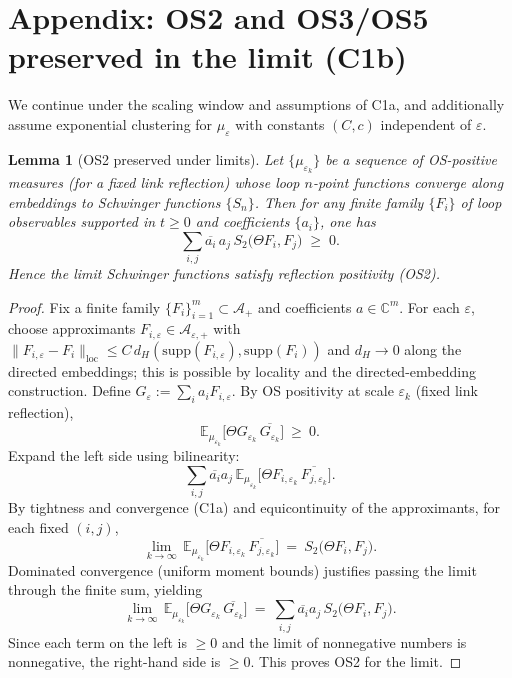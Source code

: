 \documentclass[11pt]{amsart}
\theoremstyle{plain}
\newtheorem{lemma}[theorem]{Lemma}
\theoremstyle{definition}
\theoremstyle{remark}
\begin{document}
\section{Appendix: OS2 and OS3/OS5 preserved in the limit (C1b)}

We continue under the scaling window and assumptions of C1a, and additionally assume exponential clustering for $\mu_\varepsilon$ with constants $(C,c)$ independent of $\varepsilon$.

\begin{lemma}[OS2 preserved under limits]
Let $\{\mu_{\varepsilon_k}\}$ be a sequence of OS-positive measures (for a fixed link reflection) whose loop $n$-point functions converge along embeddings to Schwinger functions $\{S_n\}$. Then for any finite family $\{F_i\}$ of loop observables supported in $t\ge 0$ and coefficients $\{a_i\}$, one has
\[
  \sum_{i,j} \overline{a_i}\, a_j\, S_2\bigl(\Theta F_i, F_j\bigr)\;\ge\;0.
\]
Hence the limit Schwinger functions satisfy reflection positivity (OS2).
\end{lemma}

\begin{proof}[Proof]
Fix a finite family $\{F_i\}_{i=1}^m\subset\mathcal A_+$ and coefficients $a\in\mathbb C^m$. For each $\varepsilon$, choose approximants $F_{i,\varepsilon}\in\mathcal A_{\varepsilon,+}$ with $\|F_{i,\varepsilon}-F_i\|_{\mathrm{loc}}\le C\,d_H(\mathrm{supp}(F_{i,\varepsilon}),\mathrm{supp}(F_i))$ and $d_H\to 0$ along the directed embeddings; this is possible by locality and the directed-embedding construction. Define $G_{\varepsilon}:=\sum_i a_i F_{i,\varepsilon}$. By OS positivity at scale $\varepsilon_k$ (fixed link reflection),
\[
  \mathbb E_{\mu_{\varepsilon_k}}\bigl[\Theta G_{\varepsilon_k}\,\overline{G_{\varepsilon_k}}\bigr]\ \ge\ 0.
\]
Expand the left side using bilinearity:
\[
  \sum_{i,j} \overline{a_i} a_j\, \mathbb E_{\mu_{\varepsilon_k}}\bigl[\Theta F_{i,\varepsilon_k}\,\overline{F_{j,\varepsilon_k}}\bigr].
\]
By tightness and convergence (C1a) and equicontinuity of the approximants, for each fixed $(i,j)$,
\[
  \lim_{k\to\infty}\,\mathbb E_{\mu_{\varepsilon_k}}\bigl[\Theta F_{i,\varepsilon_k}\,\overline{F_{j,\varepsilon_k}}\bigr]
   \ =\ S_2\bigl(\Theta F_i, F_j\bigr).
\]
Dominated convergence (uniform moment bounds) justifies passing the limit through the finite sum, yielding
\[
  \lim_{k\to\infty}\,\mathbb E_{\mu_{\varepsilon_k}}\bigl[\Theta G_{\varepsilon_k}\,\overline{G_{\varepsilon_k}}\bigr]
   \ =\ \sum_{i,j} \overline{a_i} a_j\, S_2\bigl(\Theta F_i, F_j\bigr).
\]
Since each term on the left is $\ge 0$ and the limit of nonnegative numbers is nonnegative, the right-hand side is $\ge 0$. This proves OS2 for the limit.
\end{proof}
\end{document}
